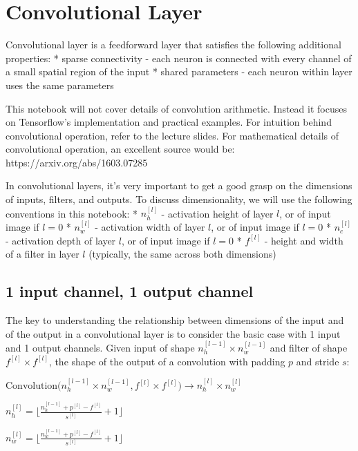 \documentclass[11pt]{article}
\begin{document}
\tableofcontents

\section{Convolutional Layer}

Convolutional layer is a feedforward layer that satisfies the following additional properties:
* sparse connectivity - each neuron is connected with every channel of a small spatial region of the input
* shared parameters - each neuron within layer uses the same parameters

This notebook will not cover details of convolution arithmetic.
Instead it focuses on Tensorflow's implementation and practical examples.
For intuition behind convolutional operation, refer to the lecture slides.
For mathematical details of convolutional operation, an excellent source would be:
https://arxiv.org/abs/1603.07285

In convolutional layers, it's very important to get a good grasp on the dimensions of inputs, filters, and outputs. To discuss dimensionality, we will use the following conventions in this notebook:
* $ n^{[l]}_h $ - activation height of layer $l$, or of input image if $l = 0$
* $ n^{[l]}_w $ - activation width of layer $l$, or of input image if $l = 0$
* $ n^{[l]}_c $ - activation depth of layer $l$, or of input image if $l = 0$
* $ f^{[l]} $ - height and width of a filter in layer $l$ (typically, the same across both dimensions)

\subsection{1 input channel, 1 output channel}

The key to understanding the relationship between dimensions of the input and of the output in a convolutional layer is to consider the basic case with 1 input and 1 output channels. Given input of shape $ n^{[l-1]}_h \times n^{[l-1]}_w $ and filter of shape $ f^{[l]} \times f^{[l]} $, the shape of the output of a convolution with padding $p$ and stride $s$:

$ \text{Convolution}\big( n^{[l-1]}_h \times n^{[l-1]}_w, f^{[l]} \times f^{[l]} \big) \rightarrow n^{[l]}_h \times n^{[l]}_w $

$ n^{[l]}_h = \big\lfloor \frac{n^{[l-1]}_h + p^{[l]} - f^{[l]}}{s^{[l]}} + 1 \big\rfloor $

$ n^{[l]}_w = \big\lfloor \frac{n^{[l-1]}_w + p^{[l]} - f^{[l]}}{s^{[l]}} + 1 \big\rfloor $
\end{document}
